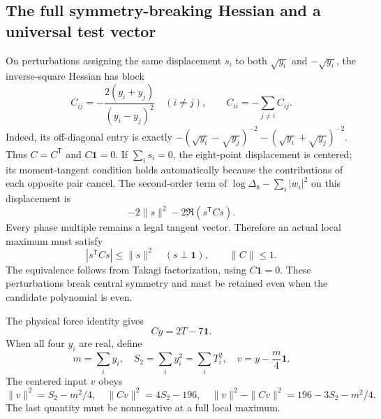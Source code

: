 \documentclass[11pt,a4paper]{article}
\theoremstyle{remark}
\begin{document}
\subsection{The full symmetry-breaking Hessian and a universal test vector}
On perturbations assigning the same displacement $s_i$ to both
$\sqrt{y_i}$ and $-\sqrt{y_i}$, the inverse-square Hessian has block
\[
 C_{ij}=-\frac{2(y_i+y_j)}{(y_i-y_j)^2}\quad(i\ne j),\qquad
 C_{ii}=-\sum_{j\ne i}C_{ij}.
\]
Indeed, its off-diagonal entry is exactly
$-(\sqrt{y_i}-\sqrt{y_j})^{-2}-(\sqrt{y_i}+\sqrt{y_j})^{-2}$.
Thus $C=C^{\mathsf T}$ and $C\mathbf1=0$.
If $\sum_i s_i=0$, the eight-point displacement is centered;
its moment-tangent condition holds automatically because the
contributions of each opposite pair cancel. The second-order term
of $\log\Delta_8-\sum_i|w_i|^2$ on this displacement is
\[
 -2\|s\|^2-2\Re(s^{\mathsf T}Cs).
\]
Every phase multiple remains a legal tangent vector. Therefore an
actual local maximum must satisfy
\begin{equation}\label{eq:eight-even-new-C-contract}
 |s^{\mathsf T}Cs|\le\|s\|^2\quad(s\perp\mathbf1),\qquad
 \|C\|\le1.
\end{equation}
The equivalence follows from Takagi factorization, using $C\mathbf1=0$.
These perturbations break central symmetry and must be retained even
when the candidate polynomial is even.

The physical force identity gives
\[
 Cy=2T-7\mathbf1.
\]
When all four $y_i$ are real, define
\[
 m=\sum_i y_i,\quad S_2=\sum_i y_i^2=\sum_iT_i^2,\quad
 v=y-\frac m4\mathbf1.
\]
The centered input $v$ obeys
\begin{equation}\label{eq:eight-even-new-defect}
 \|v\|^2=S_2-m^2/4,\quad
 \|Cv\|^2=4S_2-196,\quad
 \|v\|^2-\|Cv\|^2=196-3S_2-m^2/4.
\end{equation}
The last quantity must be nonnegative at a full local maximum.
\end{document}
